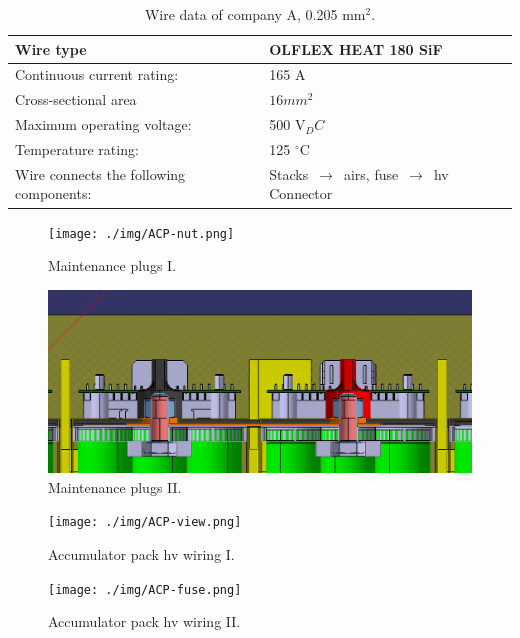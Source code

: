 \begin{table}[htbp]
	\centering
	\caption{Wire data of company A, 0.205 mm$^2$.}
	\begin{tabularx}{\textwidth}{|X|X|}\hline
		Wire type & OLFLEX HEAT 180 SiF \\[\TableSize]\hline
		Continuous current rating: & 165 A \\[\TableSize]\hline
		Cross-sectional area & $16mm^2$ \\[\TableSize]\hline
		Maximum operating voltage: &  500 V$_DC$\\[\TableSize]\hline
		Temperature rating: &  125 $^\circ$C\\[\TableSize]\hline
		Wire connects the following components: & Stacks $\,\to\,$ \glspl{air}, fuse $\,\to\,$ \gls{hv} Connector \\[\TableSize]\hline
	\end{tabularx}%
	\label{tab:acc-wire}%
\end{table}%

\begin{figure}[H]
	\centering
	\texttt{[image: ./img/ACP-nut.png]}
	\caption{Maintenance plugs I.}
	\label{fig:acp-maintance-plug}
\end{figure}

\begin{figure}[H]
	\centering
	\includegraphics[width=\textwidth]{./img/ACP-nut2.png}
	\caption{Maintenance plugs II.}
	\label{fig:acp-maintance-plug2}
\end{figure}

\begin{figure}[H]
	\centering
	\texttt{[image: ./img/ACP-view.png]}
	\caption{Accumulator pack \gls{hv} wiring I.}
	\label{fig:acp-hv-wiring}
\end{figure}

\begin{figure}[H]
	\centering
	\texttt{[image: ./img/ACP-fuse.png]}
	\caption{Accumulator pack \gls{hv} wiring II.}
	\label{fig:acp-hv-wiring2}
\end{figure}

